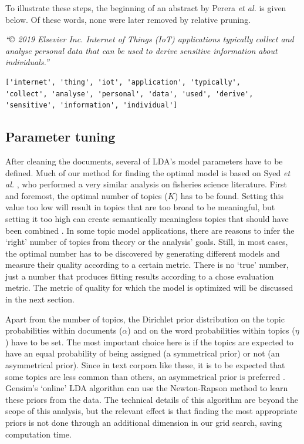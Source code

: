 \documentclass[runningheads]{llncs}
\begin{document}
To illustrate these steps, the beginning of an abstract by Perera \textit{et al.} \cite{perera_designing_2020} is given below. Of these words, none were later removed by relative pruning.

\begin{displayquote}
\textit{“© 2019 Elsevier Inc. Internet of Things (IoT) applications typically collect and analyse personal data that can be used to derive sensitive information about individuals.”}
\end{displayquote}

\begin{displayquote}
\begin{verbatim}
['internet', 'thing', 'iot', 'application', 'typically', 
'collect', 'analyse', 'personal', 'data', 'used', 'derive', 
'sensitive', 'information', 'individual']
\end{verbatim}
\end{displayquote}

\subsection{Parameter tuning}
\label{parameters}
After cleaning the documents, several of LDA’s model parameters have to be defined. Much of our method for finding the optimal model is based on Syed \textit{et al.} \cite{syed_narrow_2018}, who performed a very similar analysis on fisheries science literature. First and foremost, the optimal number of topics ($K$) has to be found. Setting this value too low will result in topics that are too broad to be meaningful, but setting it too high can create semantically meaningless topics that should have been combined \cite{syed_full-text_2017}. In some topic model applications, there are reasons to infer the ‘right’ number of topics from theory or the analysis’ goals. Still, in most cases, the optimal number has to be discovered by generating different models and measure their quality according to a certain metric. There is no ‘true’ number, just a number that produces fitting results according to a chose evaluation metric. The metric of quality for which the model is optimized will be discussed in the next section. 

Apart from the number of topics, the Dirichlet prior distribution on the topic probabilities within documents ($\alpha$) and on the word probabilities within topics ($\eta$) have to be set. The most important choice here is if the topics are expected to have an equal probability of being assigned (a symmetrical prior) or not (an asymmetrical prior). Since in text corpora like these, it is to be expected that some topics are less common than others, an asymmetrical prior is preferred \cite{wallach_rethinking_nodate,syed_exploring_2018}. Gensim’s ‘online’ LDA algorithm \cite{hoffman_online_2010} can use the Newton-Rapson method \cite{huang_maximum_2005} to learn these priors from the data. The technical details of this algorithm are beyond the scope of this analysis, but the relevant effect is that finding the most appropriate priors is not done through an additional dimension in our grid search, saving computation time. 
\end{document}

